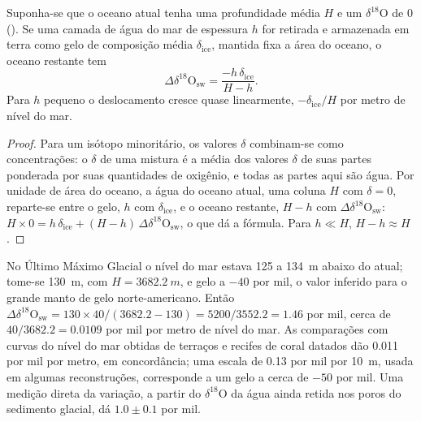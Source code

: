 \begin{proposition}\label{prop:b2:climate-proxies:mass-balance}
Suponha-se que o oceano atual tenha uma profundidade média $H$ e um $\delta^{18}$O de 0 (). Se uma camada de água
do mar de espessura $h$ for retirada e armazenada em terra como gelo de composição média
$\delta_{\mathrm{ice}}$, mantida fixa a área do oceano, o oceano restante tem
\[
  \Delta\delta^{18}\mathrm{O}_{\mathrm{sw}} = \frac{-h\,\delta_{\mathrm{ice}}}{H - h}.
\]
Para $h$ pequeno o deslocamento cresce quase linearmente, $-\delta_{\mathrm{ice}}/H$ por metro de nível do mar.
\end{proposition}

\begin{proof}
Para um isótopo minoritário, os valores $\delta$ combinam-se como concentrações: o $\delta$ de uma mistura é
a média dos valores $\delta$ de suas partes ponderada por suas quantidades de oxigênio, e todas as
partes aqui são água. Por unidade de área do oceano, a água do oceano atual, uma coluna $H$ com
$\delta = 0$, reparte-se entre o gelo, $h$ com $\delta_{\mathrm{ice}}$, e o oceano restante,
$H - h$ com $\Delta\delta^{18}\mathrm{O}_{\mathrm{sw}}$:
$H \times 0 = h\,\delta_{\mathrm{ice}} + (H - h)\,\Delta\delta^{18}\mathrm{O}_{\mathrm{sw}}$, o que
dá a fórmula. Para $h \ll H$, $H - h \approx H$.
\end{proof}

\begin{example}\label{ex:b2:climate-proxies:lgm}
No Último Máximo Glacial o nível do mar estava 125 a \qty{134}{m} abaixo do atual; tome-se \qty{130}{m},
com $H = \qty{3682.2}{m}$, e gelo a $-40$ por mil, o valor inferido para o grande manto de gelo
norte-americano. Então
$\Delta\delta^{18}\mathrm{O}_{\mathrm{sw}} = 130 \times 40/(3682.2 - 130) = 5200/3552.2 = 1.46$
por mil, cerca de $40/3682.2 = 0.0109$ por mil por metro de nível do mar. As comparações com curvas do nível do mar
obtidas de terraços e recifes de coral datados dão \num{0.011} por mil por metro, em concordância; uma escala de
\num{0.13} por mil por \qty{10}{m}, usada em algumas reconstruções, corresponde a um gelo a cerca de
$-50$ por mil. Uma medição direta da variação, a partir do $\delta^{18}$O da água ainda retida
nos poros do sedimento glacial, dá $1.0 \pm 0.1$ por mil.
\end{example}

